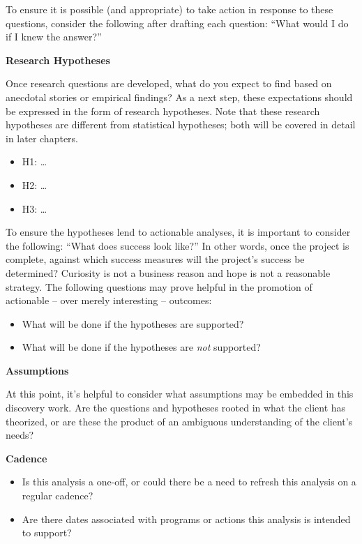\documentclass[
]{book}
\providecommand{\tightlist}{%
  \setlength{\itemsep}{0pt}\setlength{\parskip}{0pt}}
\begin{document}
To ensure it is possible (and appropriate) to take action in response to these questions, consider the following after drafting each question: ``What would I do if I knew the answer?''

\textbf{Research Hypotheses}

Once research questions are developed, what do you expect to find based on anecdotal stories or empirical findings? As a next step, these expectations should be expressed in the form of research hypotheses. Note that these research hypotheses are different from statistical hypotheses; both will be covered in detail in later chapters.

\begin{itemize}
\tightlist
\item
  H1: \ldots{}
\item
  H2: \ldots{}
\item
  H3: \ldots{}
\end{itemize}

To ensure the hypotheses lend to actionable analyses, it is important to consider the following: ``What does success look like?'' In other words, once the project is complete, against which success measures will the project's success be determined? Curiosity is not a business reason and hope is not a reasonable strategy. The following questions may prove helpful in the promotion of actionable -- over merely interesting -- outcomes:

\begin{itemize}
\tightlist
\item
  What will be done if the hypotheses are supported?
\item
  What will be done if the hypotheses are \emph{not} supported?
\end{itemize}

\textbf{Assumptions}

At this point, it's helpful to consider what assumptions may be embedded in this discovery work. Are the questions and hypotheses rooted in what the client has theorized, or are these the product of an ambiguous understanding of the client's needs?

\textbf{Cadence}

\begin{itemize}
\tightlist
\item
  Is this analysis a one-off, or could there be a need to refresh this analysis on a regular cadence?
\item
  Are there dates associated with programs or actions this analysis is intended to support?
\end{itemize}
\end{document}
